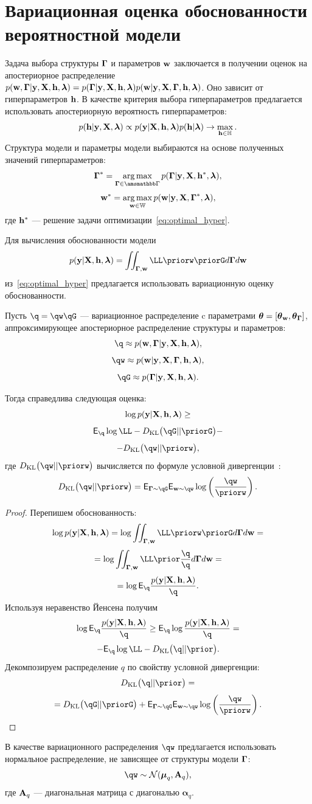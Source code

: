 \section{Вариационная оценка обоснованности вероятностной модели}
Задача выбора структуры $\boldsymbol{\Gamma}$ и параметров $\mathbf{w}$ заключается в получении оценок на апостериорное распределение $p(\mathbf{w}, \boldsymbol{\Gamma}|\mathbf{y}, \mathbf{X}, \mathbf{h},\boldsymbol{\lambda}) = p(\boldsymbol{\Gamma}|\mathbf{y}, \mathbf{X}, \mathbf{h},\boldsymbol{\lambda})p(\mathbf{w}|\mathbf{y}, \mathbf{X}, \boldsymbol{\Gamma}, \mathbf{h},\boldsymbol{\lambda})$. Оно зависит от гиперпараметров $\mathbf{h}$. 
В качестве критерия выбора гиперпараметров предлагается использовать апостериорную вероятность гиперпараметров:
\begin{equation}
\label{eq:optimal_hyper}
    p(\mathbf{h}|\mathbf{y}, \mathbf{X},\boldsymbol{\lambda}) \propto p(\mathbf{y}|\mathbf{X}, \mathbf{h},\boldsymbol{\lambda}) p(\mathbf{h}|\boldsymbol{\lambda}) \to \max_{\mathbf{h} \in \mathbb{H}}.
\end{equation}
Структура модели и параметры модели выбираются на основе полученных значений гиперпараметров:
\[
    \G^* = \argmax_{\G \in \Gb} p(\G|\y, \X, \h^*, \lam ),
\]
\[
    \mathbf{w}^* = \operatorname*{arg\,max}_{\mathbf{w} \in \mathbb{W}} p(\mathbf{w}|\mathbf{y}, \mathbf{X}, \boldsymbol{\Gamma}^*, \boldsymbol{\lambda}),
\]
где $\mathbf{h}^*$ --- решение задачи оптимизации~\eqref{eq:optimal_hyper}.

Для вычисления обоснованности модели $$\EV = \iint_{\G, \w}\LL \priorw \priorG d\G d\w$$ из~\eqref{eq:optimal_hyper} предлагается использовать вариационную оценку обоснованности.

\begin{theorem}
Пусть $\q = \qw \qG$ --- вариационное распределение c параметрами $\boldsymbol{\theta}= [\boldsymbol{\theta}_\mathbf{w}, \boldsymbol{\theta}_{\boldsymbol{\Gamma}} ]$, аппроксимирующее апостериорное распределение структуры и параметров:
\[
    \q \approx \post,
\]
\[
    \qw  \approx \postw,
\]
\[
    \qG \approx \postG.
\]

Тогда справедлива следующая оценка:
\begin{equation}
\label{eq:full_elbo}
\log p(\mathbf{y}|\mathbf{X}, \mathbf{h},\boldsymbol{\lambda}) \geq
\end{equation}
\[
 \E_{\q}  \log \LL - \KL{\qG}{\priorG} - 
\]
\[
 - \KL{\qw}{\priorw},
\]
где $\KL{\qw}{\priorw}$ вычисляется по формуле условной дивергенции~\cite{TODO}:
\[
\KL{\qw}{\priorw} = \E_{\G \sim \qG} \E_{\w \sim \qw} \log \left(\frac{\qw}{\priorw}\right).
\]
\end{theorem}

\begin{proof}
Перепишем обоснованность:
\[
\log \EV  =  \log \iint_{\G,\w} \LL \priorw \priorG d\G d\w  =
\]
\[
   = \log\iint_{\G,\w} \LL \prior  \frac{\q}{\q}d\G d\w =
\]
\[
  =  \log \E_{\q} \frac{\EV}{\q}.
\]
Используя неравенство Йенсена получим 
\[
 \log \E_{\q} \frac{\EV}{\q} \geq  \E_{\q}\log \frac{\EV}{\q} = 
\]
\[
 -  \E_{\q} \log \LL - \KL{\q}{\prior}.
\]
Декомпозируем распределение $q$ по свойству условной дивергенции:
\[
\KL{\q}{\prior} = 
\]
\begin{equation}
\label{eq:kl_full}
= \KL{\qG}{\priorG} + \E_{\G \sim \qG} \E_{\w \sim \qw} \log \left(\frac{\qw}{\priorw}\right).    
\end{equation}
\end{proof}
В качестве вариационного распределения $\qw$ предлагается использовать нормальное распределение, не зависящее от структуры модели $\boldsymbol{\Gamma}$:
\[
    \qw  \sim \mathcal{N}(\boldsymbol{\mu}_q, \A_q), 
\]
где $\mathbf{A}_q$ --- диагональная матрица с диагональю $\boldsymbol{\alpha}_q$.

